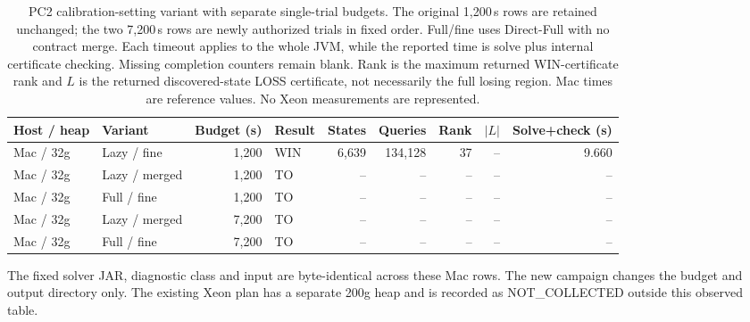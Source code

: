 \documentclass{article}
\begin{document}
\begin{table}[ht]
\centering
\small
\begin{tabular}{llrlrrrrr}
\toprule
Host / heap & Variant & Budget (s) & Result & States & Queries & Rank & $|L|$ & Solve+check (s) \\
\midrule
Mac / 32g & Lazy / fine & 1,200 & WIN & 6,639 & 134,128 & 37 & -- & 9.660 \\
Mac / 32g & Lazy / merged & 1,200 & TO & -- & -- & -- & -- & -- \\
Mac / 32g & Full / fine & 1,200 & TO & -- & -- & -- & -- & -- \\
Mac / 32g & Lazy / merged & 7,200 & TO & -- & -- & -- & -- & -- \\
Mac / 32g & Full / fine & 7,200 & TO & -- & -- & -- & -- & -- \\
\bottomrule
\end{tabular}
\caption{PC2 calibration-setting variant with separate single-trial budgets. The original 1,200\,s rows are retained unchanged; the two 7,200\,s rows are newly authorized trials in fixed order. Full/fine uses Direct-Full with no contract merge. Each timeout applies to the whole JVM, while the reported time is solve plus internal certificate checking. Missing completion counters remain blank. Rank is the maximum returned WIN-certificate rank and $L$ is the returned discovered-state LOSS certificate, not necessarily the full losing region. Mac times are reference values. No Xeon measurements are represented.}
\label{tab:pc2-extended-budget}
\end{table}

\noindent The fixed solver JAR, diagnostic class and input are byte-identical across these Mac rows. The new campaign changes the budget and output directory only. The existing Xeon plan has a separate 200g heap and is recorded as NOT\_COLLECTED outside this observed table.
\end{document}
